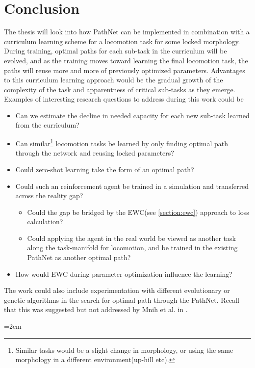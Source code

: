 \documentclass[a4paper,english]{report}
\begin{document}
\chapter{Conclusion}
The thesis will look into how PathNet can be implemented in combination with a curriculum learning scheme for a locomotion task for some locked morphology. During training, optimal paths for each sub-task in the curriculum will be evolved, and as the training moves toward learning the final locomotion task, the paths will reuse more and more of previously optimized parameters. Advantages to this curriculum learning approach would be the gradual growth of the complexity of the task and apparentness of critical sub-tasks as they emerge.  
\newline\newline
Examples of interesting research questions to address during this work could be 
\begin{itemize}
\item Can we estimate the decline in needed capacity for each new sub-task learned from the curriculum?
\item Can similar\footnote{Similar tasks would be a slight change in morphology, or using the same morphology in a different environment(up-hill etc).} locomotion tasks be learned by only finding optimal path through the network and reusing locked parameters?
\item Could zero-shot learning take the form of an optimal path? 
\item Could such an reinforcement agent be trained in a simulation and transferred across the reality gap?
    \begin{itemize}
    \item Could the gap be bridged by the EWC(see \ref{section:ewc}) approach to loss calculation?
    \item Could applying the agent in the real world be viewed as another task along the task-manifold for locomotion, and be trained in the existing PathNet as another optimal path? 
    \end{itemize}
\item How would EWC during parameter optimization influence the learning?
\end{itemize}
The work could also include experimentation with different evolutionary or genetic algorithms in the search for optimal path through the PathNet. Recall that this was suggested but not addressed by Mnih et al. in \cite{pathnet}.


\cleardoublepage
{}


\emergencystretch=2em
\printbibliography
\end{document}
